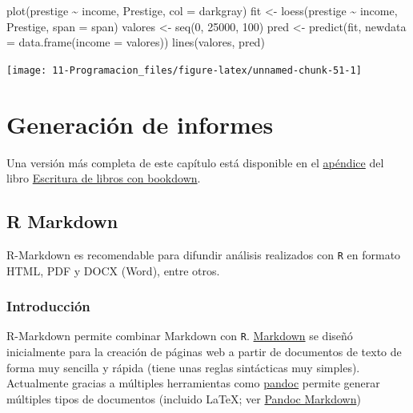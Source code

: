 \documentclass[
]{book}
\newenvironment{Shaded}{\begin{snugshade}}{\end{snugshade}}
\newcommand{\AttributeTok}[1]{\textcolor[rgb]{0.77,0.63,0.00}{#1}}
\newcommand{\DecValTok}[1]{\textcolor[rgb]{0.00,0.00,0.81}{#1}}
\newcommand{\FunctionTok}[1]{\textcolor[rgb]{0.00,0.00,0.00}{#1}}
\newcommand{\NormalTok}[1]{#1}
\newcommand{\OtherTok}[1]{\textcolor[rgb]{0.56,0.35,0.01}{#1}}
\newcommand{\SpecialCharTok}[1]{\textcolor[rgb]{0.00,0.00,0.00}{#1}}
\newcommand{\StringTok}[1]{\textcolor[rgb]{0.31,0.60,0.02}{#1}}
\theoremstyle{break}
\theoremstyle{nonumberplain}
\begin{document}
\begin{Shaded}
\begin{Highlighting}[]
\FunctionTok{plot}\NormalTok{(prestige }\SpecialCharTok{\textasciitilde{}}\NormalTok{ income, Prestige, }\AttributeTok{col =} \StringTok{\textquotesingle{}darkgray\textquotesingle{}}\NormalTok{)}
\NormalTok{fit }\OtherTok{\textless{}{-}} \FunctionTok{loess}\NormalTok{(prestige }\SpecialCharTok{\textasciitilde{}}\NormalTok{ income, Prestige, }\AttributeTok{span =}\NormalTok{ span)}
\NormalTok{valores }\OtherTok{\textless{}{-}} \FunctionTok{seq}\NormalTok{(}\DecValTok{0}\NormalTok{, }\DecValTok{25000}\NormalTok{, }\DecValTok{100}\NormalTok{)}
\NormalTok{pred }\OtherTok{\textless{}{-}} \FunctionTok{predict}\NormalTok{(fit, }\AttributeTok{newdata =} \FunctionTok{data.frame}\NormalTok{(}\AttributeTok{income =}\NormalTok{ valores))}
\FunctionTok{lines}\NormalTok{(valores, pred)}
\end{Highlighting}
\end{Shaded}

\begin{center}\texttt{[image: 11-Programacion\_files/figure-latex/unnamed-chunk-51-1]} \end{center}

\hypertarget{informes}{%
\chapter{Generación de informes}\label{informes}}

Una versión más completa de este capítulo está disponible en el
\href{https://rubenfcasal.github.io/bookdown_intro/rmarkdown.html}{apéndice} del libro
\href{https://rubenfcasal.github.io/bookdown_intro}{Escritura de libros con bookdown}.

\hypertarget{r-markdown}{%
\section{R Markdown}\label{r-markdown}}

R-Markdown es recomendable para difundir análisis realizados con \texttt{R} en formato HTML, PDF y DOCX (Word), entre otros.

\hypertarget{introducciuxf3n-1}{%
\subsection{Introducción}\label{introducciuxf3n-1}}

R-Markdown permite combinar Markdown con \texttt{R}. \href{http://daringfireball.net/projects/markdown/}{Markdown} se diseñó inicialmente para la creación de páginas web a partir de documentos de texto de forma muy sencilla y rápida (tiene unas reglas sintácticas muy simples). Actualmente gracias a múltiples herramientas como \href{http://pandoc.org/}{pandoc} permite generar múltiples tipos de documentos (incluido LaTeX; ver \href{http://rmarkdown.rstudio.com/authoring_pandoc_markdown.html}{Pandoc Markdown})
\end{document}
